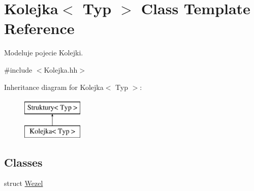 \hypertarget{class_kolejka}{\section{Kolejka$<$ Typ $>$ Class Template Reference}
\label{class_kolejka}
}


Modeluje pojecie Kolejki.  




{\ttfamily \#include $<$Kolejka.\-hh$>$}

Inheritance diagram for Kolejka$<$ Typ $>$\-:\begin{figure}[H]
\begin{center}
\leavevmode
\includegraphics[height=2.000000cm]{class_kolejka}
\end{center}
\end{figure}
\subsection*{Classes}
\begin{DoxyCompactItemize}
\item 
struct \hyperlink{struct_kolejka_1_1_wezel}{Wezel}
\end{DoxyCompactItemize}
